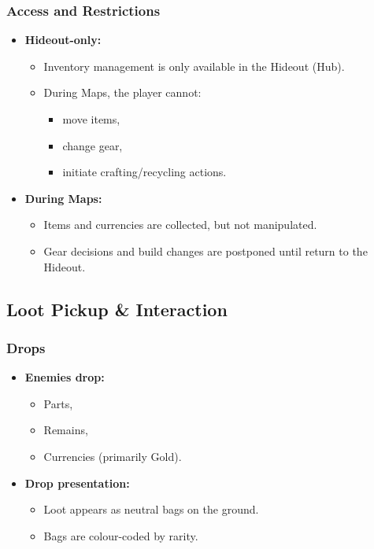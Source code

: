 \subsubsection*{Access and Restrictions}

\begin{itemize}
	\item \textbf{Hideout-only:} 
	\begin{itemize}
		\item Inventory management is only available in the Hideout (Hub).
		\item During Maps, the player cannot:
		\begin{itemize}
			\item move items,
			\item change gear,
			\item initiate crafting/recycling actions.
		\end{itemize}
	\end{itemize}
	\item \textbf{During Maps:}
	\begin{itemize}
		\item Items and currencies are collected, but not manipulated.
		\item Gear decisions and build changes are postponed until return to the Hideout.
	\end{itemize}
\end{itemize}


\subsection{Loot Pickup \& Interaction}

\subsubsection*{Drops}

\begin{itemize}
	\item \textbf{Enemies drop:}
	\begin{itemize}
		\item Parts,
		\item Remains,
		\item Currencies (primarily Gold).
	\end{itemize}
	\item \textbf{Drop presentation:}
	\begin{itemize}
		\item Loot appears as neutral bags on the ground.
		\item Bags are colour-coded by rarity.
	\end{itemize}
\end{itemize}

